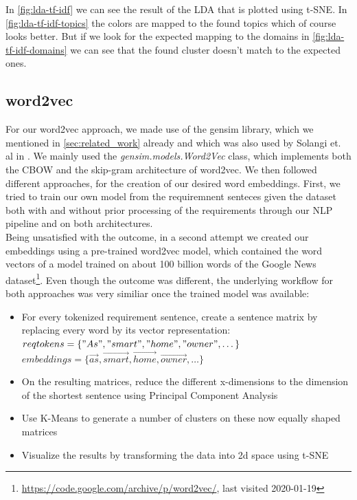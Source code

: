 In \autoref{fig:lda-tf-idf} we can see the result of the LDA that is plotted using t-SNE. In \autoref{fig:lda-tf-idf-topics} the colors are mapped to the found topics which of course looks better. But if we look for the expected mapping to the domains in \autoref{fig:lda-tf-idf-domains} we can see that the found cluster doesn't match to the expected ones.

\subsection{word2vec} %
\label{sub:own_word2vec}
For our word2vec approach, we made use of the gensim library, which we mentioned in \autoref{sec:related_work} already and which was also used by Solangi et. al in \cite{solangi_review_2018}. We mainly used the \emph{gensim.models.Word2Vec} class, which implements both the CBOW and the skip-gram architecture of word2vec. We then followed different approaches, for the creation of our desired word embeddings. First, we tried to train our own model from the requiremnent senteces given the \crowdre{} dataset both with and without prior processing of the requirements through our NLP pipeline and on both architectures.\\
Being unsatisfied with the outcome, in a second attempt we created our embeddings using a pre-trained word2vec model, which contained the word vectors of a model trained on about 100 billion words of the Google News dataset\footnote{\url{https://code.google.com/archive/p/word2vec/}, last visited 2020-01-19}. Even though the outcome was different, the underlying workflow for both approaches was very similiar once the trained model was available:
\begin{itemize}
	\item For every tokenized requirement sentence, create a sentence matrix by replacing every word by its vector representation:\\
	$reqtokens = \{"As", "smart", "home", "owner", \dots\}$\\
	$embeddings = \{ \vec{as}, \vec{smart}, \vec{home}, \vec{owner}, \dots \}$
	\item On the resulting matrices, reduce the different x-dimensions to the dimension of the shortest sentence using Principal Component Analysis
	\item Use K-Means to generate a number of clusters on these now equally shaped matrices
	\item Visualize the results by transforming the data into 2d space using t-SNE\cite{maaten_visualizing_2008}
\end{itemize}


